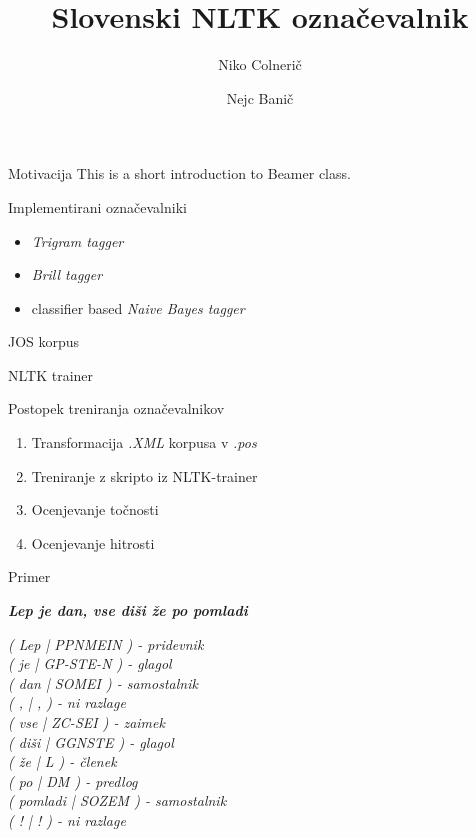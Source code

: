 \documentclass{beamer}
\title[Slovenski NLTK označevalnik]{Slovenski NLTK označevalnik}
\author{
	Niko Colnerič
	\and
	Nejc Banič}
\institute{ Fakulteta za Računalništvo in Informtiko\\
			Univerza v Ljubljani}
\begin{document}
\begin{frame}
\titlepage
\end{frame}

\begin{frame}{Motivacija}
This is a short introduction to Beamer class.
\end{frame}

\begin{frame}{Implementirani označevalniki}
\begin{itemize}
\item \textit{Trigram tagger}
\item \textit{Brill tagger}
\item classifier based \textit{Naive Bayes tagger}
\end{itemize}
\end{frame}

\begin{frame}{JOS korpus}
\end{frame}

\begin{frame}{NLTK trainer}
\end{frame}

\begin{frame}{Postopek treniranja označevalnikov}
\begin{enumerate}
\item Transformacija \textit{.XML} korpusa v \textit{.pos}
\item Treniranje z skripto iz NLTK-trainer
\item Ocenjevanje točnosti
\item Ocenjevanje hitrosti
\end{enumerate}
\end{frame}

\begin{frame}{Primer}
\begin{center}
\textit{\textbf{Lep je dan, vse diši že po pomladi}}
\end{center}
\textit{( Lep  |  PPNMEIN ) - pridevnik\\
	( je  |  GP-STE-N ) - glagol\\
	( dan  |  SOMEI ) - samostalnik\\
	( ,  |  , ) - ni razlage\\
	( vse  |  ZC-SEI ) - zaimek\\
	( diši  |  GGNSTE ) - glagol\\
	( že  |  L ) - členek\\
	( po  |  DM ) - predlog\\
	( pomladi  |  SOZEM ) - samostalnik\\
	( !  |  ! ) - ni razlage}\\
\end{frame}
\end{document}
